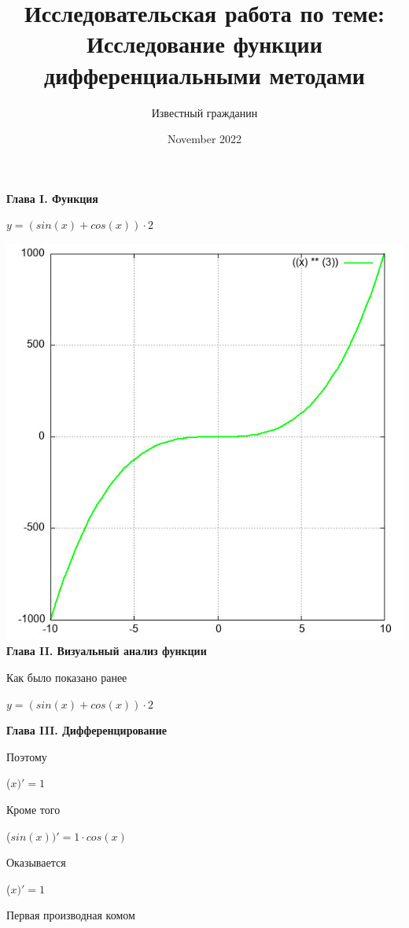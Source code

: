 \documentclass[12pt,a4paper,fleqn]{article}
\title{\textbf{\LARGE{Исследовательская работа по теме:\\Исследование функции дифференциальными методами}}}
\author{Известный гражданин}
\date{November 2022}
\begin{document}
\maketitle
\newpage\newpage \textbf{\LARGE{Глава I. Функция}}

\begin{center}
$y = $$(sin(x)+cos(x)) \cdot 2$

\end{center}
\includegraphics{GraphicDumps/plot.jpg}\newpage \textbf{\LARGE{Глава II. Визуальный анализ функции}}

Как было показано ранее

\begin{center}
$y = $$(sin(x)+cos(x)) \cdot 2$

\end{center}
\newpage \textbf{\LARGE{Глава III. Дифференцирование}}

Поэтому

\begin{center}
 ($x)'
  = 1$\end{center}
Кроме того

\begin{center}
 ($sin(x))'
  = 1 \cdot cos(x)$\end{center}
Оказывается

\begin{center}
 ($x)'
  = 1$\end{center}
Первая производная комом\cite{link2}
\end{document}
